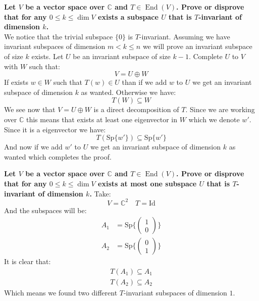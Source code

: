 \documentclass[11pt,a4paper]{article}
\theoremstyle{plain}
\DeclareMathOperator{\End}{End}
\newcommand{\Sp}{\text{Sp}}
\newcommand{\C}{\mathbb{C}}
\begin{document}
	\newpage
	\noindent
	\textbf{Let $V$ be a vector space over $\C$ and $T\in\End(V)$. Prove
	or disprove that for any $0 \le k \le \dim V$ exists a subspace $U$ that
	is $T$-invariant of dimension $k$.} \\
	We notice that the trivial subspace $\{0\}$ is $T$-invariant. Assuming
	we have invariant subspaces of dimension $m < k \le n$ we will prove
	an invariant subspace of size $k$ exists. Let $U$ be an invariant subspace
	of size $k-1$. Complete $U$ to $V$ with $W$ such that:
	\[
		V = U \oplus W
	\]
	If exists $w \in W$ such that $T(w) \in U$ than if we add $w$ to $U$
	we get an invariant subspace of dimension $k$ as wanted. Otherwise
	we have:
	\[
		T(W) \subseteq W
	\]
	We see now that $V = U \oplus W$ is a direct decomposition of $T$. Since
	we are working over $\C$ this means that exists at least one eigenvector
	in $W$ which we denote $w'$. Since it is a eigenvector we have:
	\[
		T(\Sp\{w'\}) \subseteq \Sp\{w'\}
	\]
	And now if we add $w'$ to $U$ we get an invariant subspace of dimension 
	$k$ as wanted which completes the proof.
	
	\noindent
	\textbf{Let $V$ be a vector space over $\C$ and $T\in\End(V)$. Prove
	or disprove that for any $0 \le k \le \dim V$ exists at most one subspace 
	$U$ that is $T$-invariant of dimension $k$.}
	Take:
	\[
		V = \C^2 \quad T = \mathrm{Id}
	\]
	And the subspaces will be:
	\begin{align*}
		A_1 &= \Sp \{\begin{pmatrix} 1 \\ 0\end{pmatrix}\}  \\
		A_2 &= \Sp \{\begin{pmatrix} 0 \\ 1\end{pmatrix}\}
	\end{align*}
	It is clear that:
	\begin{align*}
		T(A_1) \subseteq A_1 \\
		T(A_2) \subseteq A_2 
	\end{align*}
	Which means we found two different $T$-invariant subspaces of dimension $1$.
	
\end{document}
